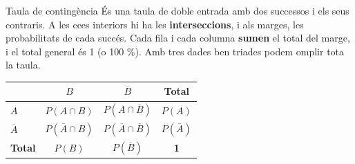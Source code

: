 \documentclass[11pt,a4paper]{article}
\begin{document}
\begin{fmdef}{Taula de contingència}
És una taula de doble entrada amb dos successos i els seus contraris. A les ce\lgem{}es interiors hi ha les \textbf{interseccions}, i als marges, les probabilitats de cada succés. Cada fila i cada columna \textbf{sumen} el total del marge, i el total general és 1 (o 100 \%). Amb tres dades ben triades podem omplir tota la taula.

\begin{center}\renewcommand{\arraystretch}{1.55}\setlength{\tabcolsep}{9pt}\begin{tabular}{l|cc|c}\toprule
\textbf{} & \textbf{$B$} & \textbf{$\overline{B}$} & \textbf{Total}\\\midrule
\textbf{$A$} & $P(A\cap B)$ & $P(A\cap\overline{B})$ & \textbf{$P(A)$}\\
\textbf{$\overline{A}$} & $P(\overline{A}\cap B)$ & $P(\overline{A}\cap\overline{B})$ & \textbf{$P(\overline{A})$}\\
\midrule\textbf{Total} & \textbf{$P(B)$} & \textbf{$P(\overline{B})$} & \textbf{1}\\
\bottomrule\end{tabular}\end{center}
\end{fmdef}
\end{document}
